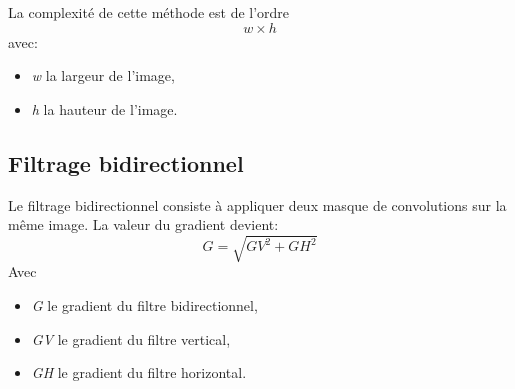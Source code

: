 \documentclass[11pt]{article}
\begin{document}
	La complexité de cette méthode est de l’ordre \[w \times h\] avec:
	\begin{itemize}
		\item \textit{w} la largeur de l’image,
		\item \textit{h} la hauteur de l’image. 
	\end{itemize}


	\subsection{Filtrage bidirectionnel}

	Le filtrage bidirectionnel consiste à appliquer deux masque de convolutions sur la même image.
	La valeur du gradient devient: 
	\[G = \sqrt{GV^2 + GH^2}\]
	Avec 
	\begin{itemize}
		\item \textit{G} le gradient du filtre bidirectionnel,
		\item \textit{GV} le gradient du filtre vertical,
		\item \textit{GH} le gradient du filtre horizontal.
	\end{itemize}
            
\end{document}
